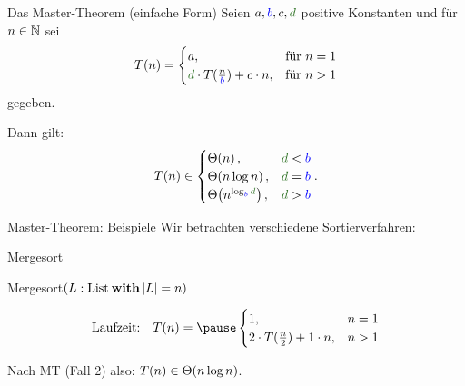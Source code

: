 \begin{frame}{Das Master-Theorem (einfache Form)} %
	Seien $a, \textcolor{blue}{b}, c, \textcolor{darkgreen}{d}$ positive Konstanten und für $n \in \mathbb{N}$ sei 
	\[
	T(n) = 
	\begin{cases}
	a,  & \text{für } n = 1 \\
	\textcolor{darkgreen}{d} \cdot T\large(\frac{n}{\textcolor{blue}{b}}\large) + c\·n, & \text{für } n > 1
	\end{cases}
	\]
	gegeben. \\ \smallskip
	
	Dann gilt:
	\[
	T(n) \in 
	\begin{cases}
	\Th{n},                                                        & \textcolor{darkgreen}{d} < \textcolor{blue}{b} \\
	\Th{n \log n},                                                 & \textcolor{darkgreen}{d} = \textcolor{blue}{b} \\
	\Th{n^{\log _{\textcolor{blue}{b}} \textcolor{darkgreen}{d}}}, & \textcolor{darkgreen}{d} > \textcolor{blue}{b}
	\end{cases}.
	\]
\end{frame}

\begin{frame}[t]{Master-Theorem: Beispiele} 
	Wir betrachten verschiedene Sortierverfahren:\\
	\bigskip
	
	\begin{exampleblock}{Mergesort}
		\begin{algorithm}[H]
			\KwMethod Mergesort$(L: \|List| \: \KwSty{with} \size{L} = n)$
		\end{algorithm}
	\end{exampleblock}	
	
	\[\text{Laufzeit:} \quad T(n) = \pause \begin{cases}
	1, & n = 1\\
	2 \cdot T(\fract n/2 ) + 1 \cdot n, & n > 1
	\end{cases}\]
	
	\pause
	Nach MT (Fall 2) also: $T(n) \in \Theta\!\left(n \log n\right)$.
\end{frame}

